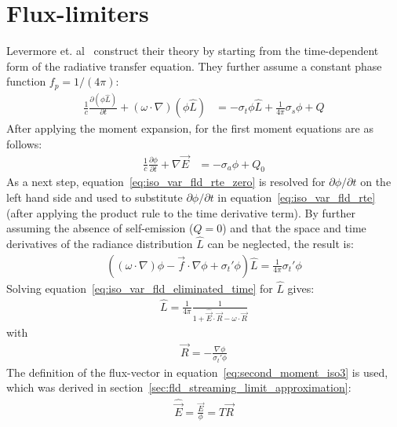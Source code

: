 \section{Flux-limiters}
\label{sec:fld_vef_factors}

Levermore et. al~\cite{Levermore81} construct their theory by starting from the time-dependent form of the radiative transfer equation. They further assume a constant phase function $f_p=1/(4\pi)$:
\begin{align}
\label{eq:iso_var_fld_rte}
\frac{1}{c}\frac{\partial (\phi\hat{L})}{\partial t} + \left(\omega\cdot\nabla\right)(\phi\hat{L})&=-\sigma_t\phi\hat{L} + \frac{1}{4\pi}\sigma_s\phi + Q
\end{align}
After applying the moment expansion, for the first moment equations are as follows:
\begin{align}
\label{eq:iso_var_fld_rte_zero}
\frac{1}{c}\frac{\partial \phi}{\partial t} + \nabla\vec{E} &= -\sigma_a\phi + Q_0
\end{align}
As a next step, equation~\ref{eq:iso_var_fld_rte_zero} is resolved for $\partial \phi/\partial t$ on the left hand side and used to substitute $\partial\phi/\partial t$ in equation~\ref{eq:iso_var_fld_rte} (after applying the product rule to the time derivative term). By further assuming the absence of self-emission ($Q=0$) and that the space and time derivatives of the radiance distribution $\hat{L}$ can be neglected, the result is:
\begin{align}
\label{eq:iso_var_fld_eliminated_time}
\left( \left(\omega\cdot\nabla\right)\phi -\vec{f}\cdot\nabla\phi + \sigma_t'\phi\right)\hat{L} = \frac{1}{4\pi}\sigma_t'\phi
\end{align}
Solving equation~\ref{eq:iso_var_fld_eliminated_time} for $\hat{L}$ gives:
\begin{align}
\label{eq:iso_var_fld_Lhat}
\hat{L} = \frac{1}{4\pi}\frac{1}{1+\widehat{\vec{E}}\cdot\vec{R}-\omega\cdot\vec{R}}
\end{align}
with
\begin{align}
\label{eq:iso_var_fld_R}
\vec{R} = -\frac{\nabla\phi}{\sigma_t'\phi}
\end{align}
The definition of the flux-vector in equation~\ref{eq:second_moment_iso3} is used, which was derived in section~\ref{sec:fld_streaming_limit_approximation}:
\begin{align}
\widehat{\vec{E}} = \frac{\vec{E}}{\phi}= T\vec{R}
\label{eq:iso_var_fld_normalized_flux}
\end{align}

